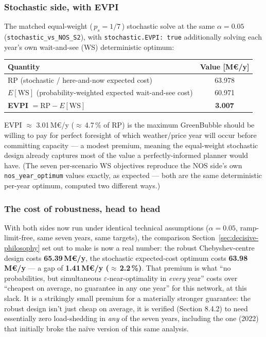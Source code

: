 \documentclass[11pt]{article}
\begin{document}
\subsubsection{Stochastic side, with EVPI}
The matched equal-weight (\,$p_s=1/7$\,) stochastic solve at the same
$\alpha=0.05$ (\texttt{stochastic\_vs\_NOS\_S2}), with
\texttt{stochastic.EVPI: true} additionally solving each year's own
wait-and-see (WS) deterministic optimum:
\begin{center}
\small
\begin{tabular}{@{}lc@{}}
\toprule
Quantity & Value [M€/y] \\
\midrule
RP (stochastic / here-and-now expected cost) & 63.978 \\
$E[\text{WS}]$ (probability-weighted expected wait-and-see cost) & 60.971 \\
\textbf{EVPI} $= \text{RP} - E[\text{WS}]$ & \textbf{3.007} \\
\bottomrule
\end{tabular}
\end{center}
EVPI $\approx$ 3.01\,M€/y ($\approx$\,4.7\,\% of RP) is
the maximum GreenBubble should be willing to pay for perfect foresight of
which weather/price year will occur before committing capacity --- a
modest premium, meaning the equal-weight stochastic design already
captures most of the value a perfectly-informed planner would have.
(The seven per-scenario WS objectives reproduce the NOS side's own
\texttt{nos\_year\_optimum} values exactly, as expected --- both are the
same deterministic per-year optimum, computed two different ways.)

\subsubsection{The cost of robustness, head to head}
With both sides now run under identical technical assumptions ($\alpha =
0.05$, ramp-limit-free, same seven years, same targets), the comparison
Section~\ref{sec:decisive-philosophy} set out to make is now a real number:
the robust Chebyshev-centre design costs \textbf{65.39\,M€/y}, the
stochastic expected-cost optimum costs \textbf{63.98\,M€/y} --- a gap of
\textbf{1.41\,M€/y ($\approx$\,2.2\,\%)}. That premium is what
``no probabilities, but simultaneous $\varepsilon$-near-optimality in
\emph{every} year'' costs over ``cheapest on average, no guarantee in any
one year'' for this network, at this slack. It is a strikingly small
premium for a materially stronger guarantee: the robust design isn't just
cheap on average, it is verified (Section 8.4.2) to need essentially zero
load-shedding in \emph{any} of the seven years, including the one
(2022) that initially broke the na\"ive version of this same analysis.
\end{document}
